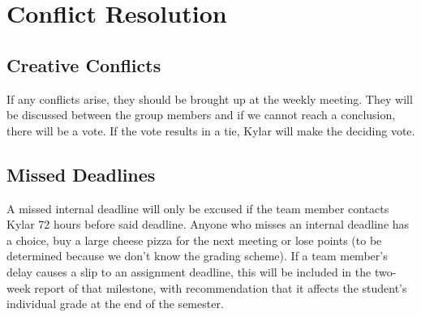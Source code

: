 \documentclass[letterpaper,11pt]{texMemo}
\begin{document}
\section*{Conflict Resolution}

\subsection*{Creative Conflicts}
If any conflicts arise, they should be brought up at the weekly meeting. They 
will be discussed between the group members and if we cannot reach a 
conclusion, there will be a vote. If the vote results in a tie, 
Kylar will make the deciding vote. 

\subsection*{Missed Deadlines}
A missed internal deadline will only be excused if the team member contacts 
Kylar 72 hours before said deadline. Anyone who misses an internal deadline 
has a choice, buy a large cheese pizza for the next meeting or lose points 
(to be determined because we don’t know the grading scheme). If a team member’s 
delay causes a slip to an assignment deadline, this will be included in the 
two-week report of that milestone, with recommendation that it affects the 
student’s individual grade at the end of the semester.
\end{document}
